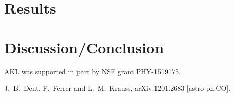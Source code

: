 \documentclass[nofootinbib,aps,prd,preprint,superscriptaddress]{revtex4}
\begin{document}
\section{Results}


\section{Discussion/Conclusion}	
	
\acknowledgments

AKL was supported in part by NSF grant PHY-1519175.


\begin{thebibliography}{99}

  J.~B.~Dent, F.~Ferrer and L.~M.~Krauss,
  arXiv:1201.2683 [astro-ph.CO].


\end{thebibliography}
\end{document}
